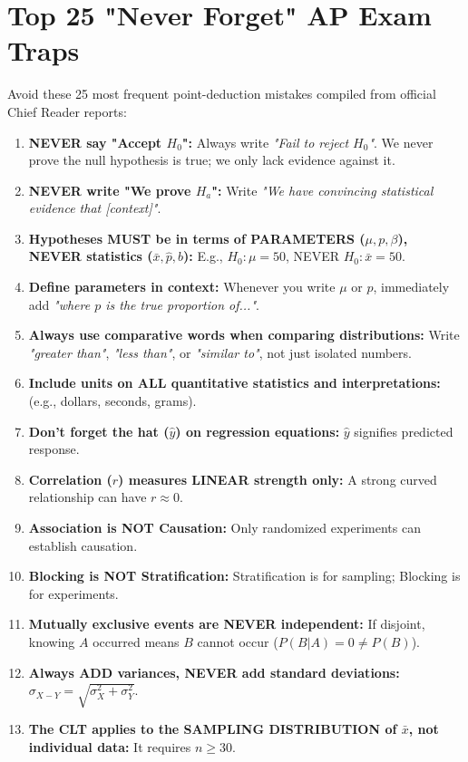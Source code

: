 \chapter{Top 25 "Never Forget" AP Exam Traps}

Avoid these 25 most frequent point-deduction mistakes compiled from official Chief Reader reports:

\begin{enumerate}[label=\textbf{\arabic*.}]
    \item \textbf{NEVER say "Accept $H_0$":} Always write \emph{"Fail to reject $H_0$"}. We never prove the null hypothesis is true; we only lack evidence against it.
    \item \textbf{NEVER write "We prove $H_a$":} Write \emph{"We have convincing statistical evidence that [context]"}.
    \item \textbf{Hypotheses MUST be in terms of PARAMETERS ($\mu, p, \beta$), NEVER statistics ($\bar{x}, \hat{p}, b$):} E.g., $H_0: \mu = 50$, NEVER $H_0: \bar{x} = 50$.
    \item \textbf{Define parameters in context:} Whenever you write $\mu$ or $p$, immediately add \emph{"where $p$ is the true proportion of..."}.
    \item \textbf{Always use comparative words when comparing distributions:} Write \emph{"greater than"}, \emph{"less than"}, or \emph{"similar to"}, not just isolated numbers.
    \item \textbf{Include units on ALL quantitative statistics and interpretations:} (e.g., dollars, seconds, grams).
    \item \textbf{Don't forget the hat ($\hat{y}$) on regression equations:} $\hat{y}$ signifies predicted response.
    \item \textbf{Correlation ($r$) measures LINEAR strength only:} A strong curved relationship can have $r \approx 0$.
    \item \textbf{Association is NOT Causation:} Only randomized experiments can establish causation.
    \item \textbf{Blocking is NOT Stratification:} Stratification is for sampling; Blocking is for experiments.
    \item \textbf{Mutually exclusive events are NEVER independent:} If disjoint, knowing $A$ occurred means $B$ cannot occur ($P(B|A)=0 \ne P(B)$).
    \item \textbf{Always ADD variances, NEVER add standard deviations:} $\sigma_{X-Y} = \sqrt{\sigma_X^2 + \sigma_Y^2}$.
    \item \textbf{The CLT applies to the SAMPLING DISTRIBUTION of $\bar{x}$, not individual data:} It requires $n \ge 30$.

\end{enumerate}
